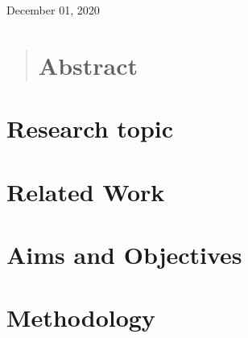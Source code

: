 \documentclass[
11pt, %
oneside, %
english, %
onehalfspacing,%
headsepline, %
]{MastersDoctoralThesis} %
\begin{document}
\begin{titlepage}
\begin{center}

\centerline{\large \subjectname}
{\large December 01, 2020}\\[2cm] %
\vfill
\end{center}
\end{titlepage}








\begin{abstract}
  \chapter*{Abstract}

\end{abstract}

\vspace*{50px}
\bigskip

\tableofcontents
\newpage

\listoffigures
\newpage

\chapter*{Research topic}

\chapter*{Related Work}

\chapter*{Aims and Objectives}

\chapter*{Methodology}

\printbibliography\
\end{document}
